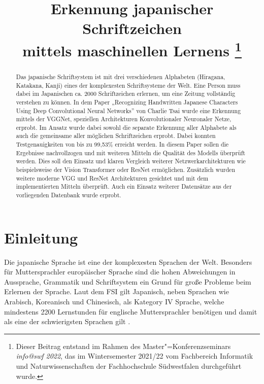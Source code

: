 \documentclass[twoside,a4paper]{IEEEtran}
\begin{document}
\title{Erkennung japanischer Schriftzeichen \\mittels maschinellen Lernens%
    \thanks{%
    Dieser Beitrag entstand im 
    Rahmen des Master"=Konferenzseminars \emph{info@swf 2022}, das im
    Wintersemester 2021/22 vom Fachbereich Informatik und
    Naturwissenschaften der Fachhochschule Südwestfalen
    durchgeführt wurde.}}
\author{
}

\maketitle


\begin{abstract}
Das japanische Schriftsystem ist mit drei verschiedenen Alphabeten (Hiragana, Katakana, Kanji) eines der komplexesten Schriftsysteme der Welt. Eine Person muss dabei im Japanischen ca. 2000 Schriftzeichen erlernen, um eine Zeitung vollständig verstehen zu können. In dem Paper „Recognizing Handwritten Japanese Characters Using Deep Convolutional Neural Networks” von Charlie Tsai wurde eine Erkennung mittels der VGGNet, speziellen Architekturen Konvolutionaler Neuronaler Netze, erprobt. Im Ansatz wurde dabei sowohl die separate Erkennung aller Alphabete als auch die gemeinsame aller möglichen Schriftzeichen erprobt. Dabei konnten Testgenauigkeiten von bis zu 99,53\% erreicht werden. In diesem Paper sollen die Ergebnisse nachvollzogen und mit weiteren Mitteln die Qualität des Modells überprüft werden. Dies soll den Einsatz und klaren Vergleich weiterer Netzwerkarchitekturen wie beispielsweise der Vision Transformer oder ResNet ermöglichen. Zusätzlich wurden weitere moderne VGG und ResNet Architekturen gesichtet und mit dem implementierten Mitteln überprüft. Auch ein Einsatz weiterer Datensätze aus der vorliegenden Datenbank wurde erprobt. 
\end{abstract}


\section{Einleitung}
Die japanische Sprache ist eine der komplexesten Sprachen der Welt. Besonders für Muttersprachler europäischer Sprache sind die hohen Abweichungen in Aussprache, Grammatik und Schriftsystem ein Grund für große Probleme beim Erlernen der Sprache. Laut dem FSI gilt Japanisch, neben Sprachen wie Arabisch, Koreanisch und Chinesisch, als Kategory IV Sprache, welche mindestens 2200 Lernstunden für englische Muttersprachler benötigen und damit als eine der schwierigsten Sprachen gilt \cite{FSI}.
\end{document}
